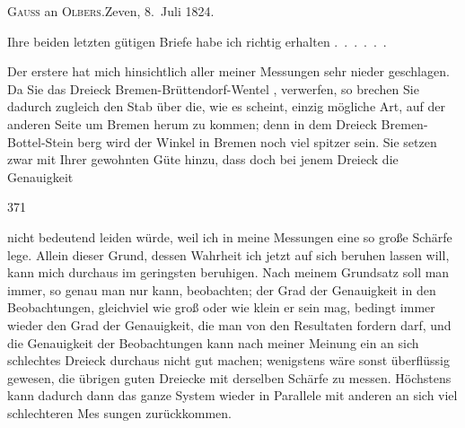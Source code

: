 \begin{center}
\textsc{Gauss} an \textsc{Olbers}.\quad Zeven, 8.~Juli 1824.
\end{center}

\par\noindent\hspace*{\parindent}Ihre beiden letzten gütigen Briefe habe ich richtig erhalten .\ .\ .\ .\ .\ .

\par\noindent\hspace*{\parindent}Der erstere hat mich hinsichtlich aller meiner Messungen sehr nieder\-%
geschlagen. Da Sie das Dreieck Bremen-Brüttendorf-Wentel , verwerfen, so brechen Sie dadurch zugleich
den Stab über die, wie es scheint, einzig mögliche Art, auf der anderen Seite
um Bremen herum zu kommen; denn in dem Dreieck Bremen-Bottel-Stein\-%
berg wird der Winkel in Bremen noch viel spitzer sein. Sie setzen zwar mit Ihrer
gewohnten Güte hinzu, dass doch bei jenem Dreieck die Genauigkeit 
\par\clearpage
{}\hfill371\par\medskip
\noindent{} nicht bedeutend leiden würde, weil ich in meine Messungen eine so
große Schärfe lege. Allein dieser Grund, dessen Wahrheit ich jetzt auf sich
beruhen lassen will, kann mich durchaus im geringsten  beruhigen.
Nach meinem Grundsatz soll man immer, so genau man nur kann, beobachten;
der Grad der Genauigkeit in den Beobachtungen, gleichviel wie groß oder
wie klein er sein mag, bedingt immer wieder den Grad der Genauigkeit, die
man von den Resultaten fordern darf, und die Genauigkeit der Beobachtungen
kann nach meiner Meinung ein an sich schlechtes Dreieck durchaus nicht
gut machen; wenigstens wäre sonst überflüssig gewesen, die übrigen guten
Dreiecke mit derselben Schärfe zu messen. Höchstens kann dadurch dann
das ganze System wieder in Parallele mit anderen an sich viel schlechteren Mes\-%
sungen zurückkommen.

